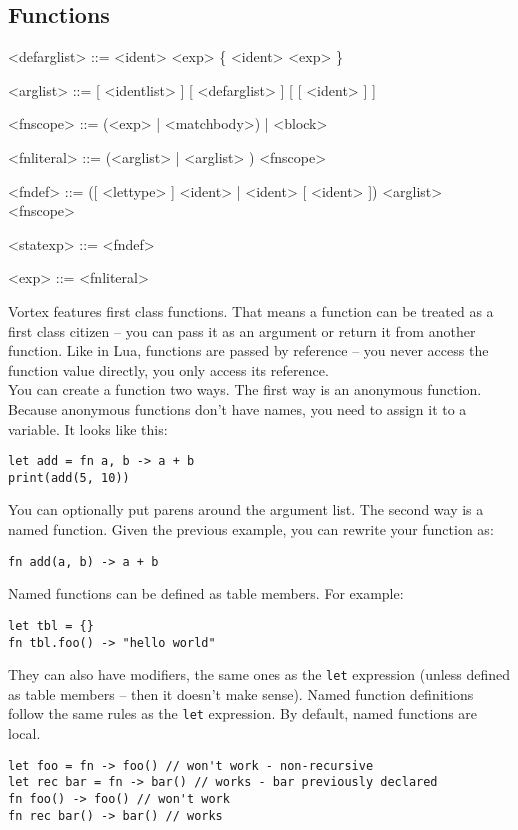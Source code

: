 \documentclass{article}
\newenvironment{bnf}
{
\begin{mdframed}
\begin{grammar}
}
{
\end{grammar}
\end{mdframed}
}
\begin{document}
\subsection{Functions}
\begin{bnf}
<defarglist> ::= <ident> \lit{=} <exp> \{ \lit{,} <ident> \lit{=} <exp> \}

<arglist> ::= [ <identlist> ] [ <defarglist> ] [ [ <ident> ]  ]

<fnscope> ::= \lit{->} (<exp> | <matchbody>) | <block>

<fnliteral> ::=  (<arglist> | \lit{(} <arglist> \lit{)}) <fnscope>

<fndef> ::=  ([ <lettype> ] <ident> | <ident> [  <ident> ])
    \lit{(} <arglist> \lit{)} <fnscope>

<statexp> ::= <fndef>

<exp> ::= <fnliteral>
\end{bnf}
Vortex features first class functions. That means a function can be treated
as a first class citizen -- you can pass it as an argument or return it from
another function. Like in Lua, functions are passed by reference -- you never
access the function value directly, you only access its reference.\\
You can create a function two ways. The first way is an anonymous function.
Because anonymous functions don't have names, you need to assign it to a
variable. It looks like this:
\begin{lstlisting}[language=vortex]
let add = fn a, b -> a + b
print(add(5, 10))
\end{lstlisting}
You can optionally put parens around the argument list. The second way is
a named function. Given the previous example, you can rewrite your function
as:
\begin{lstlisting}[language=vortex]
fn add(a, b) -> a + b
\end{lstlisting}
Named functions can be defined as table members. For example:
\begin{lstlisting}[language=vortex]
let tbl = {}
fn tbl.foo() -> "hello world"
\end{lstlisting}
They can also have modifiers, the same ones as the \verb|let| expression
(unless defined as table members -- then it doesn't make sense). Named
function definitions follow the same rules as the \verb|let| expression.
By default, named functions are local.
\begin{lstlisting}[language=vortex]
let foo = fn -> foo() // won't work - non-recursive
let rec bar = fn -> bar() // works - bar previously declared
fn foo() -> foo() // won't work
fn rec bar() -> bar() // works
\end{lstlisting}
\end{document}
